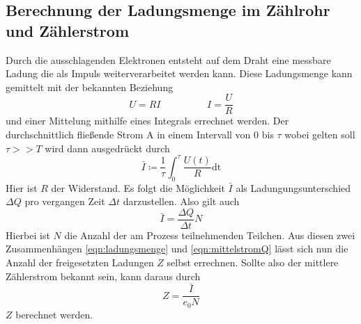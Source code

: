 \subsection{Berechnung der Ladungsmenge im Zählrohr und Zählerstrom}
Durch die ausschlagenden Elektronen entsteht auf dem Draht eine messbare Ladung die als Impuls weiterverarbeitet werden kann.
Diese Ladungsmenge kann gemittelt mit der bekannten Beziehung
\begin{equation*}
U=RI \hspace{2cm} I=\frac{U}{R}
\end{equation*}
und einer Mittelung mithilfe eines Integrals errechnet werden.
Der durchschnittlich fließende Strom $\si{\ampere}$ in einem Intervall von $0$ bis $\tau$ wobei gelten soll $\tau>>T$ wird dann ausgedrückt durch
\begin{equation}
\label{eqn:ladungsmenge}
\bar{\si{I}} \coloneqq \frac{1}{\tau} \int_{0}^{\tau} \frac{U(t)}{R} \text{dt}
\end{equation}
Hier ist $R$ der Widerstand. 
Es folgt die Möglichkeit $\bar{\si{I}}$ als Ladungungsunterschied $\Delta \si{Q}$ pro vergangen Zeit $\Delta \si{t}$ darzustellen. 
Also gilt auch
\begin{equation}
\label{eqn:mittelstromQ}
\bar{\si{I}} = \frac{\Delta \si{Q}}{\Delta\si{t}}\si{N}
\end{equation}  
Hierbei ist $\si{N}$ die Anzahl der am Prozess teilnehmenden Teilchen.
Aus diesen zwei Zusammenhängen \eqref{eqn:ladungsmenge} und \eqref{eqn:mittelstromQ} lässt sich nun die Anzahl der freigesetzten Ladungen $\si{Z}$
selbst errechnen. Sollte also der mittlere Zählerstrom bekannt sein, kann daraus durch 
\begin{equation}
\label{eqn:teilchen}
\si{Z} = \frac{\bar{\si{I}}}{e_0N}
\end{equation}
$\si{Z}$ berechnet werden.

